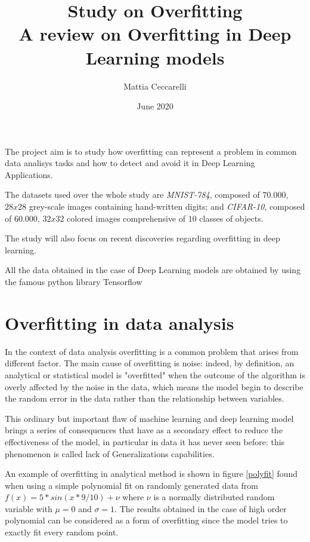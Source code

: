 \documentclass[11pt,a4paper]{article}
\title{\Huge{\textbf{Study on Overfitting}} \\ 
                \vspace{5mm}
                \large{A review on Overfitting in Deep Learning  models}}
\author{Mattia Ceccarelli}
\date{June 2020}
\begin{document}
\maketitle

The project aim is to study how overfitting can represent a problem in common data analisys tasks and how to detect and avoid it in Deep Learning Applications.

The datasets used over the whole study are \textit{MNIST-784}, composed of $70.000$, $28 x 28$ grey-scale images containing hand-written digits; and \textit{CIFAR-10}, composed of $60.000$, $32 x 32$ colored images comprehensive of $10$ classes of objects.

The study will also focus on recent discoveries regarding overfitting in deep learning.

All the data obtained in the case of Deep Learning models are obtained by using the famous python library Tensorflow \cite{tf} 

\section*{Overfitting in data analysis}

In the context of data analysis overfitting is a common problem that arises from different factor. 
The main cause of overfitting is noise: indeed, by definition, an analytical or statistical model is "overfitted" when the outcome of the algorithm is overly affected by the noise in the data, which means the model begin to describe the random error in the data rather than the relationship between variables.

This ordinary but important flaw of machine learning and deep learning model brings a series of consequences that have as a secondary effect to reduce the effectiveness of the model, in particular in data it has never seen before: this phenomenon is called lack of Generalizations capabilities.

An example of overfitting in analytical method is shown in figure \ref{polyfit} found when using a simple polynomial fit on randomly generated data from $f(x) = 5 * sin(x * 9 / 10) + \nu$ where $\nu$ is a normally distributed random variable with $\mu = 0$ and $\sigma = 1$. The results obtained in the case of high order polynomial can be considered as a form of overfitting since the model tries to exactly fit every random  point.    
\end{document}
